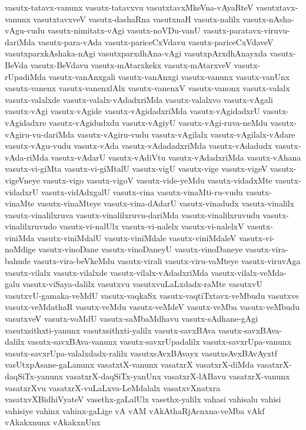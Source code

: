 {vasutx-tatavx-vanunx
vasutx-tatavxvu
vasutxtavxMkeVna-vAyaRteV
vasutxtavx-vanunx
vasutxtavxveV
vasutx-dashaRna
vasutxnaH
vasutx-nalilx
vasutx-nAsha-vAgu-vudu
vasutx-nimitatx-vAgi
vasutx-noVDu-vanU
vasutx-paratavx-viruvu-dariMda
vasutx-para-vAda
vasutx-pariceCxVdavu
vasutx-pariceCxVdaveV
vasutxparxkAshaka-nAgi
vasutxparxdhAna-vAgi
vasutxpArxdhAnayxda
vasutx-BeVda
vasutx-BeVdavu
vasutx-mAtarxkekx
vasutx-mAtarxveV
vasutx-rUpadiMda
vasutx-vanAnxgali
vasutx-vanAnxgi
vasutx-vanunx
vasutx-vanUnx
vasutx-vanenx
vasutx-vanenxlAlx
vasutx-vanenxV
vasutx-vanonx
vasutx-valalx
vasutx-valalxde
vasutx-valalx-vAdadxriMda
vasutx-valalxvo
vasutx-vAgali
vasutx-vAgi
vasutx-vAgide
vasutx-vAgidadxriMda
vasutx-vAgidadxrU
vasutx-vAgidadxre
vasutx-vAgidudxdu
vasutx-vAgiyU
vasutx-vAgi-ruva-neMdu
vasutx-vAgiru-vu-dariMda
vasutx-vAgiru-vudu
vasutx-vAgilalx
vasutx-vAgilalx-vAdare
vasutx-vAgu-vudu
vasutx-vAda
vasutx-vAdadadxriMda
vasutx-vAdadudx
vasutx-vAda-riMda
vasutx-vAdarU
vasutx-vAdiVtu
vasutx-vAdadxriMda
vasutx-vAhana
vasutx-vi-giMta
vasutx-vi-giMtalU
vasutx-vigU
vasutx-vige
vasutx-vigeV
vasutx-vigeVneye
vasutx-vigo
vasutx-vigoV
vasutx-vide-yeMdu
vasutx-vidadxMte
vasutx-vidadxrU
vasutx-vidAdxgalU
vasutx-vina
vasutx-vinaMti-ru-vudu
vasutx-vinaMte
vasutx-vinaMteye
vasutx-vina-dAdarU
vasutx-vinadudx
vasutx-vinalilx
vasutx-vinalilxruva
vasutx-vinalilxruvu-dariMda
vasutx-vinalilxruvudu
vasutx-vinalilxruvudo
vasutx-vi-nalUlx
vasutx-vi-nalelx
vasutx-vi-nalelxV
vasutx-viniMda
vasutx-viniMdalU
vasutx-viniMdale
vasutx-viniMdaleV
vasutx-vi-noMdige
vasutx-vinoDane
vasutx-vinoDaneyU
vasutx-vinoDaneye
vasutx-vira-bahude
vasutx-vira-beVkeMdu
vasutx-virali
vasutx-viru-vaMteye
vasutx-viruvAga
vasutx-vilalx
vasutx-vilalxde
vasutx-vilalx-vAdadxriMda
vasutx-vilalx-veMda-galu
vasutx-viSaya-dalilx
vasutxvu
vasutxvuLaLxdadx-raMte
vasutxvU
vasutxvU-gamaka-veMdU
vasutx-vaqkaSx
vasutx-vaqtiTxtavx-veMbudu
vasutxve
vasutx-veMdathaR
vasutx-veMdu
vasutx-veMdeV
vasutx-veMba
vasutx-veMbudu
vasutxveV
vasutx-voMdU
vasutx-saMbaMdhavu
vasutx-sAdhane-gAgi
vasutxsithxti-yanunx
vasutxsithxti-yalilx
vasutx-savxBAva
vasutx-savxBAva-dalilx
vasutx-savxBAva-vanunx
vasutx-savxrUpadalilx
vasutx-savxrUpa-vanunx
vasutx-savxrUpa-valalxdadx-ralilx
vasutxsAvxBAvayx
vasutxsAvxBAvAyxtf
vasUtxpAsane-gaLanunx
vasatxtX-vanunx
vasatxrX
vasatxrX-diMda
vasatxrX-daqSiTx-yanunx
vasatxrX-daqSiTx-yanUnx
vasatxrX-lABavu
vasatxrX-vanunx
vasatxrXvu
vasatxrX-vuLaLxva-LeMdalalx
vasatxvXnatxra
vasatxvXBidhiVyateV
vasethx-gaLalUlx
vasethx-yalilx
vahasi
vahisalu
vahisi
vahisiye
vahinx
vahinx-gaLige
vA
vAM
vAkAthaRjAcnxna-veMba
vAkf
vAkakxnunx
vAkakxnUnx
}
